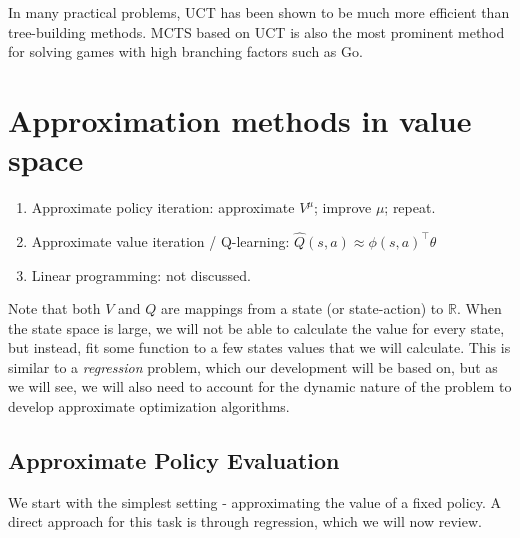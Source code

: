 In many practical problems, UCT has been shown to be much more efficient than tree-building methods. MCTS based on UCT is also the most prominent method for solving games with high branching factors such as Go. 

\section{Approximation methods in value space}
\begin{enumerate}\negspace
\item Approximate policy iteration: approximate $V^\mu$; improve $\mu$; repeat.
\item Approximate value iteration / Q-learning: $\hat{Q}(s,a)\approx {\phi}(s,a)^\top {\theta}$
\item Linear programming: not discussed.
\end{enumerate}

Note that both $V$ and $Q$ are mappings from a state (or state-action) to $\mathbb{R}$. When the state space is large, we will not be able to calculate the value for every state, but instead, fit some function to a few states values that we will calculate. This is similar to a \emph{regression} problem, which our development will be based on, but as we will see, we will also need to account for the dynamic nature of the problem to develop approximate optimization algorithms.

\subsection{Approximate Policy Evaluation}

We start with the simplest setting - approximating the value of a fixed policy. A direct approach for this task is through regression, which we will now review. 

